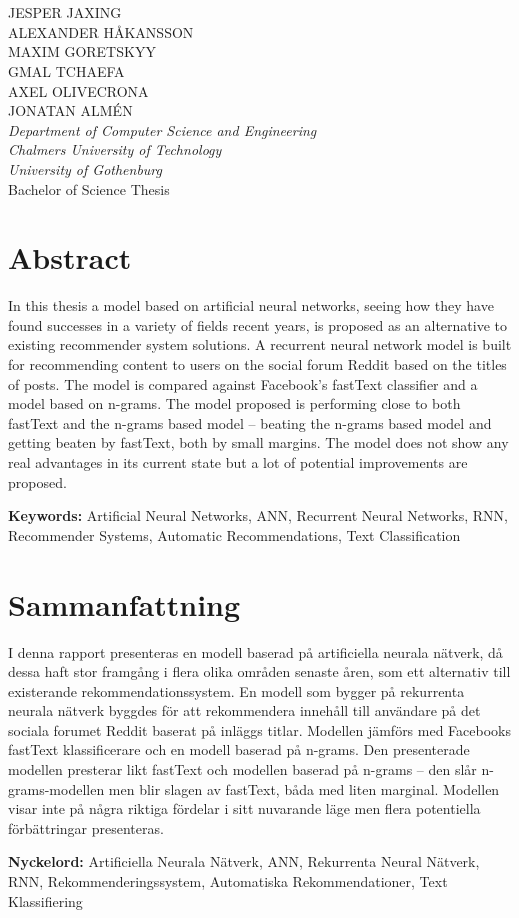 \large
\begin{flushleft}
\textbf{\varthetitle}\\
\varthesubtitle\\[0.7cm]
\end{flushleft}
JESPER JAXING\\
ALEXANDER HÅKANSSON\\
MAXIM GORETSKYY\\
GMAL TCHAEFA\\
AXEL OLIVECRONA\\
JONATAN ALMÉN\\
\normalsize
\textit{Department of Computer Science and Engineering\\
Chalmers University of Technology\\
University of Gothenburg}\\[0.7cm]
Bachelor of Science Thesis
\setlength{\parskip}{0.5cm}

\thispagestyle{plain}			%
\setlength{\parskip}{0pt plus 1.0pt}
\section*{Abstract}
In this thesis a model based on artificial neural networks, seeing how they have found successes in a variety of fields recent years, is proposed as an alternative to existing recommender system solutions. A recurrent neural network model is built for recommending content to users on the social forum Reddit based on the titles of posts. The model is compared against Facebook's fastText classifier and a model based on n-grams. The model proposed is performing close to both fastText and the n-grams based model -- beating the n-grams based model and getting beaten by fastText, both by small margins. The model does not show any real advantages in its current state but a lot of potential improvements are proposed.

\vfill
\textbf{Keywords:} Artificial Neural Networks, ANN, Recurrent Neural Networks, RNN, Recommender Systems, Automatic Recommendations, Text Classification

\newpage
\thispagestyle{empty}
\mbox{}
\vfill
\newpage
\section*{Sammanfattning}\thispagestyle{NoHeaderStyle}
I denna rapport presenteras en modell baserad på artificiella neurala nätverk, då dessa haft stor framgång i flera olika områden senaste åren, som ett alternativ till existerande rekommendationssystem. En modell som bygger på rekurrenta neurala nätverk byggdes för att rekommendera innehåll till användare på det sociala forumet Reddit baserat på inläggs titlar. Modellen jämförs med Facebooks fastText klassificerare och en modell baserad på n-grams. Den presenterade modellen presterar likt fastText och modellen baserad på n-grams -- den slår n-grams-modellen men blir slagen av fastText, båda med liten marginal. Modellen visar inte på några riktiga fördelar i sitt nuvarande läge men flera potentiella förbättringar presenteras.

\vfill
\textbf{Nyckelord:} Artificiella Neurala Nätverk, ANN, Rekurrenta Neural Nätverk, RNN, Rekommenderingssystem, Automatiska Rekommendationer, Text Klassifiering 
\newpage				%
\thispagestyle{empty}
\mbox{}